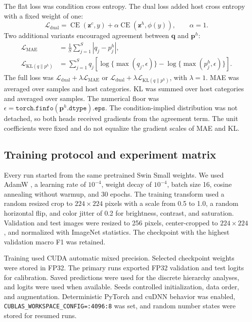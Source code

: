 \documentclass[preprint,12pt]{elsarticle}
\begin{document}
The flat loss was condition cross entropy. The dual loss added host cross
entropy with a fixed weight of one:
\begin{equation}
 \mathcal L_{\mathrm{dual}}=
 \operatorname{CE}(\mathbf z^c,y)+
 \alpha\operatorname{CE}(\mathbf z^h,\phi(y)),\qquad \alpha=1.
 \label{eq:dual}
\end{equation}
Two additional variants encouraged agreement between $\mathbf q$ and
$\mathbf p^h$:
\begin{align}
 \mathcal L_{\mathrm{MAE}}&=\frac{1}{S}\sum_{j=1}^{S}|q_j-p^h_j|,\\
 \mathcal L_{\mathrm{KL}(q\|p^h)}&=\sum_{j=1}^{S}q_j
 \left[\log\{\max(q_j,\epsilon)\}-
 \log\{\max(p^h_j,\epsilon)\}\right].
\end{align}
The full loss was $\mathcal L_{\mathrm{dual}}+\lambda
\mathcal L_{\mathrm{MAE}}$ or $\mathcal L_{\mathrm{dual}}+\lambda
\mathcal L_{\mathrm{KL}(q\|p^h)}$, with $\lambda=1$. MAE was averaged over
samples and host categories. KL was summed over host categories and averaged
over samples. The numerical floor was
$\epsilon=\texttt{torch.finfo}(\mathbf p^h.\texttt{dtype}).\texttt{eps}$.
The condition-implied distribution was not detached, so both heads received
gradients from the agreement term. The unit coefficients were fixed and do not
equalize the gradient scales of MAE and KL.

\subsection{Training protocol and experiment matrix}
\label{sec:training}

Every run started from the same pretrained Swin Small weights. We used AdamW
\cite{loshchilov2019}, a learning rate of $10^{-4}$, weight decay of
$10^{-4}$, batch size 16, cosine annealing without warmup, and 30 epochs. The
training transform used a random resized crop to $224\times224$ pixels with a
scale from 0.5 to 1.0, a random horizontal flip, and color jitter of 0.2 for
brightness, contrast, and saturation. Validation and test images were resized
to 256 pixels, center-cropped to $224\times224$, and normalized with ImageNet
statistics. The checkpoint with the highest validation macro F1 was retained.

Training used CUDA automatic mixed precision. Selected checkpoint weights were
stored in FP32. The primary runs exported FP32 validation and test logits for
calibration. Saved predictions were used for the discrete hierarchy analyses,
and logits were used when available. Seeds controlled initialization, data
order, and augmentation. Deterministic PyTorch and cuDNN behavior was enabled,
\texttt{CUBLAS\_WORKSPACE\_CONFIG=:4096:8} was set, and random number states
were stored for resumed runs.
\end{document}

